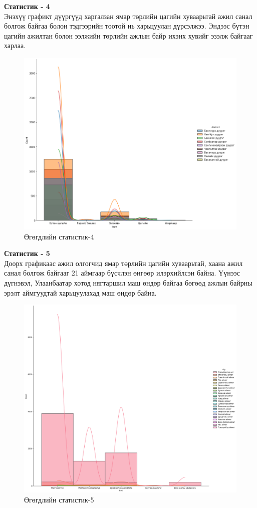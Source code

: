 \newpage
\textbf{Статистик - 4}
\\Энэхүү графикт дүүргүүд харгалзан ямар төрлийн цагийн хуваарьтай ажил санал болгож байгаа болон тэдгээрийн тоотой нь харьцуулан дүрсэлжээ. Эндээс бүтэн цагийн ажилтан болон ээлжийн төрлийн ажлын байр ихэнх хувийг эзэлж байгааг харлаа.
\begin{figure}[ht]
  \centering
  \includegraphics[width=15cm]{graphics/5.png}
  \caption{Өгөгдлийн статистик-4}\label{fig:statistics5}
\end{figure}
\newpage
\textbf{Статистик - 5}
\\Доорх графикаас ажил олгогчид ямар төрлийн цагийн хуваарьтай, хаана ажил санал болгож байгааг 21 аймгаар бүсчлэн өнгөөр илэрхийлсэн байна. Үүнээс дүгнэвэл, Улаанбаатар хотод нягтаршил маш өндөр байгаа бөгөөд ажлын байрны эрэлт аймгуудтай харьцуулахад маш өндөр байна.
\begin{figure}[ht]
  \centering
  \includegraphics[width=15cm]{graphics/6.png}
  \caption{Өгөгдлийн статистик-5}\label{fig:statistics6}
\end{figure}
